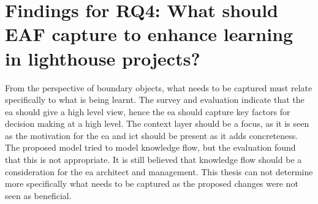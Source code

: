 \section{Findings for \textbf{RQ4:} What should EAF capture to enhance learning in lighthouse projects?} 

From the perspective of \glspl{boundary object}, what needs to be captured must relate specifically to what is being learnt. The survey and evaluation indicate that the \gls{ea} should give a high level view, hence the \gls{ea} should capture key factors for decision making at a high level. The context layer should be a focus, as it is seen as the motivation for the \gls{ea} and \gls{ict} should be present as it adds concreteness. 
The proposed model tried to model knowledge flow, but the evaluation found that this is not appropriate. It is still believed that knowledge flow should be a consideration for the \gls{ea} architect and management. This thesis can not determine more specifically what needs to be captured as the proposed changes were not seen as beneficial. 
